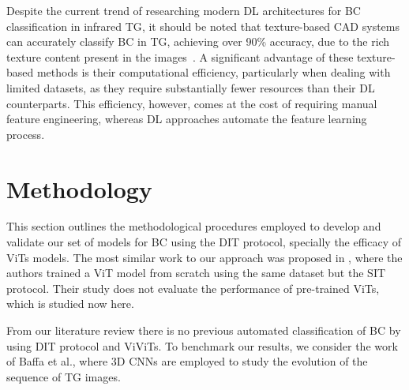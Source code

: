 \documentclass[runningheads]{llncs}
\begin{document}
Despite the current trend of researching modern \ac{DL} architectures
for \ac{BC} classification in infrared \ac{TG}, it should be noted
that texture-based \ac{CAD} systems can accurately classify \ac{BC} in
\ac{TG}, achieving over 90\% accuracy, due to the rich texture content
present in the images~\cite{Ryan2025}. A significant advantage of
these texture-based methods is their computational efficiency,
particularly when dealing with limited datasets, as they require
substantially fewer resources than their \ac{DL} counterparts. This
efficiency, however, comes at the cost of requiring manual feature
engineering, whereas \ac{DL} approaches automate the feature learning
process.

\section{Methodology}
\label{sec:methodology}

This section outlines the methodological procedures employed to
develop and validate our set of models for \ac{BC} using the \ac{DIT}
protocol, specially the efficacy of \ac{ViTs} models. The most similar
work to our approach was proposed in \cite{Garia2023}, where the
authors trained a \ac{ViT} model from scratch using the same dataset
but the \ac{SIT} protocol. Their study does not evaluate the
performance of pre-trained \ac{ViTs}, which is studied now here.

From our literature review there is no previous automated
classification of \ac{BC} by using \ac{DIT} protocol and \ac{ViViTs}. To
benchmark our results, we consider the work of Baffa et al.\cite{DeMatheus2023},
where 3D \ac{CNNs} are employed to study the evolution of the sequence
of \ac{TG} images.

\end{document}
